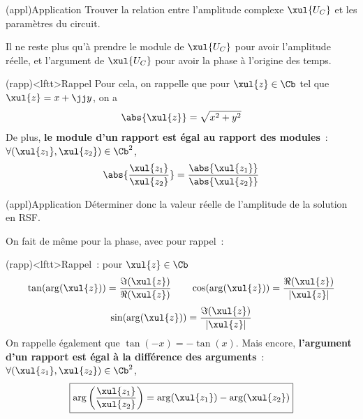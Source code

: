 \documentclass[../../main/main.tex]{subfiles}
\begin{document}
\begin{tcb}(appl){Application}
	Trouver la relation entre l'amplitude complexe $\xul{U_C}$ et les paramètres
	du circuit.
	\tcblower
\end{tcb}
Il ne reste plus qu'à prendre le module de $\xul{U_C}$ pour avoir l'amplitude
réelle, et l'argument de $\xul{U_C}$ pour avoir la phase à l'origine des
temps.
\begin{tcb}[sidebyside](rapp)<lftt>{Rappel}
	Pour cela, on rappelle que pour $\xul{z} \in \Cb$ tel que $\xul{z} = x + \jj
		y$, on a
	\[ \abs{\xul{z}} = \sqrt{x^2 + y^2}\]
	\tcblower
	De plus, \textbf{le module d'un rapport est égal au rapport des modules}~:
	$\forall (\xul{z_1}, \xul{z_2}) \in \Cb^2$,
	\[
		\abs{\frac{\xul{z_1}}{\xul{z_2}}} =
		\frac{\abs{\xul{z_1}}}{\abs{\xul{z_2}}}
	\]
\end{tcb}
\begin{tcb}(appl){Application}
	Déterminer donc la valeur réelle de l'amplitude de la solution en RSF.
	\tcblower
\end{tcb}
On fait de même pour la phase, avec pour rappel~:
\begin{tcb}[sidebyside](rapp)<lftt>{Rappel~: pour $\xul{z} \in \Cb$}
	\[\tan(\arg(\xul{z})) = \frac{\Im(\xul{z})}{\Re(\xul{z})}
		\qquad
		\cos(\arg(\xul{z})) = \frac{\Re(\xul{z})}{|\xul{z}|}
	\]
	\[
		\qquad
		\sin(\arg(\xul{z})) = \frac{\Im(\xul{z})}{|\xul{z}|}
		\qquad
	\]
	On rappelle également que $\tan(-x) = -\tan(x)$.
	\tcblower
	Mais encore,
	\textbf{l'argument d'un rapport est égal à la différence des arguments}~:
	$\forall (\xul{z_1}, \xul{z_2}) \in \Cb^2$,
	\[
		\boxed{
			\arg\left( \frac{\xul{z_1}}{\xul{z_2}} \right) =
			\arg(\xul{z_1}) - \arg(\xul{z_2})
		}
	\]
\end{tcb}
\end{document}
